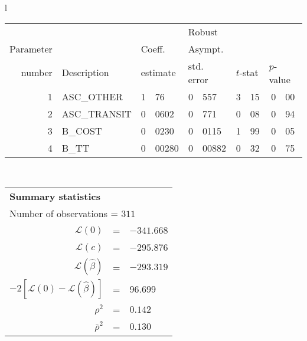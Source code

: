   \begin{tabular}{l}
\begin{tabular}{rlr@{.}lr@{.}lr@{.}lr@{.}l}
         &                       &   \multicolumn{2}{l}{}    & \multicolumn{2}{l}{Robust}  &     \multicolumn{4}{l}{}   \\
Parameter &                       &   \multicolumn{2}{l}{Coeff.}      & \multicolumn{2}{l}{Asympt.}  &     \multicolumn{4}{l}{}   \\
number &  Description                     &   \multicolumn{2}{l}{estimate}      & \multicolumn{2}{l}{std. error}  &   \multicolumn{2}{l}{$t$-stat}  &   \multicolumn{2}{l}{$p$-value}   \\

\hline

1 & ASC\_OTHER & 1&76 & 0&557 & 3&15 & 0&00 \\
2 & ASC\_TRANSIT & 0&0602 & 0&771 & 0&08 & 0&94 \\
3 & B\_COST & 0&0230 & 0&0115 & 1&99 & 0&05 \\
4 & B\_TT & 0&00280 & 0&00882 & 0&32 & 0&75 \\
\hline

\end{tabular}
\\
\begin{tabular}{rcl}
\multicolumn{3}{l}{\bf Summary statistics}\\
\multicolumn{3}{l}{ Number of observations = $311$} \\
 $\mathcal{L}(0)$ &=&  $-341.668$ \\
 $\mathcal{L}(c)$ &=& $-295.876$\\
 $\mathcal{L}(\hat{\beta})$ &=& $-293.319 $  \\
 $-2[\mathcal{L}(0) -\mathcal{L}(\hat{\beta})]$ &=& $96.699$ \\
    $\rho^2$ &=&   $0.142$ \\
    $\bar{\rho}^2$ &=&    $0.130$ \\
\end{tabular}
\end{tabular}

